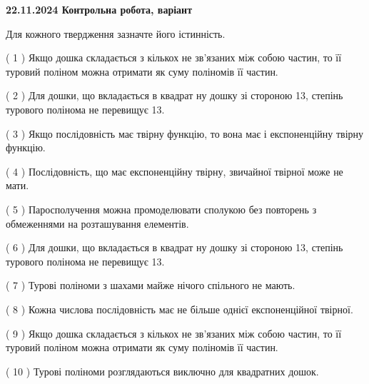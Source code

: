 \documentclass[12pt, ukrainian]{article}
\begin{document}
\vspace{4mm}
\newpage
\begin {large}

\textbf{22.11.2024 Контрольна робота, варіант  }\par


{
Для кожного твердження зазначте його істинність.\par
\vspace{2mm}
( 1 ) Якщо дошка складається з кількох не зв’язаних між собою частин, то її туровий поліном можна отримати як суму поліномів її частин.%

( 2 ) Для дошки, що вкладається в квадрат ну дошку зі стороною 13, степінь турового полінома не перевищує 13.%

( 3 ) Якщо послідовність має твірну функцію, то вона має і експоненційну твірну функцію.%

( 4 ) Послідовність, що має експоненційну твірну, звичайної твірної може не мати.%

( 5 ) Паросполучення можна промоделювати сполукою без повторень з обмеженнями на розташування елементів.%

( 6 ) Для дошки, що вкладається в квадрат ну дошку зі стороною 13, степінь турового полінома не перевищує 13.%

( 7 ) Турові поліноми з шахами майже нічого спільного не мають.%

( 8 ) Кожна числова послідовність має не більше однієї  експоненційної твірної.%

( 9 ) Якщо дошка складається з кількох не зв’язаних між собою частин, то її туровий поліном можна отримати як суму поліномів її частин.%

( 10 ) Турові поліноми розглядаються виключно для квадратних дошок.%


\vspace{5mm}
}
\end {large}
\end{document}

